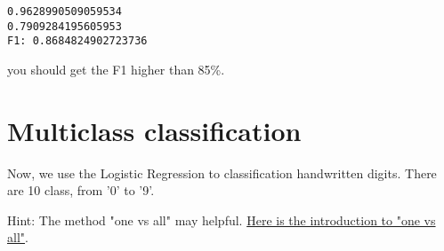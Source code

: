 \documentclass[11pt]{article}
\begin{document}
    \begin{Verbatim}[commandchars=\\\{\}]
0.9628990509059534
0.7909284195605953
F1: 0.8684824902723736

    \end{Verbatim}

    you should get the F1 higher than 85\%.

    \section{Multiclass classification}\label{multiclass-classification}

Now, we use the Logistic Regression to classification handwritten
digits. There are 10 class, from '0' to '9'.

Hint: The method "one vs all" may helpful.
\href{https://msdn.microsoft.com/library/en-us/Dn905887.aspx}{Here is
the introduction to "one vs all"}.
\end{document}

